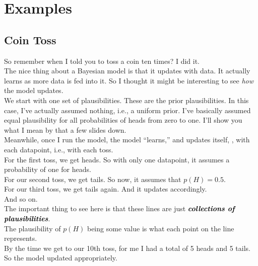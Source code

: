 \documentclass[14pt]{extarticle}
\newcommand{\mynotes}[2][Gray]{\textcolor{#1}{\textbf{\textit{#2}}}}
\begin{document}
\section{Examples}

\subsection{Coin Toss}

So remember when I told you to toss a coin ten times? I did it. \\

The nice thing about a Bayesian model is that it updates with data. It actually learns as more data is fed into it. So I thought it might be interesting to see \textit{how} the model updates. \\

We start with one set of plausibilities. These are the prior plausibilities. In this case, I've actually assumed nothing, i.e., a uniform prior. I've basically assumed equal plausibility for all probabilities of heads from zero to one. I'll show you what I mean by that a few slides down. \\

Meanwhile, once I run the model, the model ``learns,'' and updates itself, , with each datapoint, i.e., with each toss. \\

For the first toss, we get heads. So with only one datapoint, it assumes a probability of one for heads. \\

For our second toss, we get tails. So now, it assumes that $p(H) = 0.5$. \\

For our third toss, we get tails again. And it updates accordingly. \\

And so on. \\

The important thing to see here is that these lines are just \mynotes[black]{collections of plausibilities}. \\

The plausibility of $p(H)$ being some value is what each point on the line represents. \\

By the time we get to our 10th toss, for me I had a total of 5 heads and 5 tails. So the model updated appropriately. \\
\end{document}
